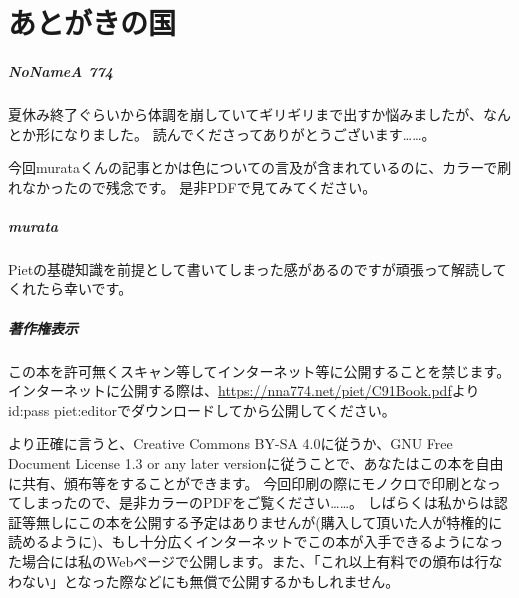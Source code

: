 \chapter*{あとがきの国}

\paragraph{NoNameA 774}

{夏休み終了ぐらいから体調を崩していてギリギリまで出すか悩みましたが、なんとか形になりました。
読んでくださってありがとうございます……。

今回murataくんの記事とかは色についての言及が含まれているのに、カラーで刷れなかったので残念です。
是非PDFで見てみてください。}

\paragraph{murata}

{Pietの基礎知識を前提として書いてしまった感があるのですが頑張って解読してくれたら幸いです。}

\paragraph{著作権表示}

{\small この本を許可無くスキャン等してインターネット等に公開することを禁じます。
インターネットに公開する際は、\url{https://nna774.net/piet/C91Book.pdf}よりid:pass piet:editorでダウンロードしてから公開してください。}

{\footnotesize より正確に言うと、Creative Commons BY-SA 4.0に従うか、GNU Free Document License 1.3 or any later versionに従うことで、あなたはこの本を自由に共有、頒布等をすることができます。
  今回印刷の際にモノクロで印刷となってしまったので、是非カラーのPDFをご覧ください……。
しばらくは私からは認証等無しにこの本を公開する予定はありませんが(購入して頂いた人が特権的に読めるように)、もし十分広くインターネットでこの本が入手できるようになった場合には私のWebページで公開します。また、「これ以上有料での頒布は行なわない」となった際などにも無償で公開するかもしれません。}
